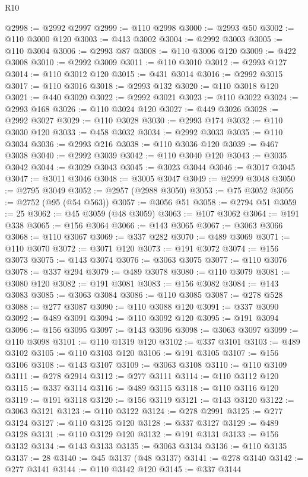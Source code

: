 \begin{lexlean}{R10}
\begin{coremodule}
@2998 := @2992 @2997
@2999 := @110 @2998
@3000 := @2993 @50
@3002 := @110 @3000 @120
@3003 := @413 @3002
@3004 := @2992 @3003
@3005 := @110 @3004
@3006 := @2993 @87
@3008 := @110 @3006 @120
@3009 := @422 @3008
@3010 := @2992 @3009
@3011 := @110 @3010
@3012 := @2993 @127
@3014 := @110 @3012 @120
@3015 := @431 @3014
@3016 := @2992 @3015
@3017 := @110 @3016
@3018 := @2993 @132
@3020 := @110 @3018 @120
@3021 := @440 @3020
@3022 := @2992 @3021
@3023 := @110 @3022
@3024 := @2993 @168
@3026 := @110 @3024 @120
@3027 := @449 @3026
@3028 := @2992 @3027
@3029 := @110 @3028
@3030 := @2993 @174
@3032 := @110 @3030 @120
@3033 := @458 @3032
@3034 := @2992 @3033
@3035 := @110 @3034
@3036 := @2993 @216
@3038 := @110 @3036 @120
@3039 := @467 @3038
@3040 := @2992 @3039
@3042 := @110 @3040 @120
@3043 := @3035 @3042
@3044 := @3029 @3043
@3045 := @3023 @3044
@3046 := @3017 @3045
@3047 := @3011 @3046
@3048 := @3005 @3047
@3049 := @2999 @3048
@3050 := @2795 @3049
@3052 := @2957 (@2988 @3050)
@3053 := @75 @3052
@3056 := @2752 (@95 (@54 @563))
@3057 := @3056 @51
@3058 := @2794 @51
@3059 := 25
@3062 := @45 @3059 (@48 @3059)
@3063 := @107 @3062
@3064 := @191 @338
@3065 := @156 @3064
@3066 := @143 @3065
@3067 := @3063 @3066
@3068 := @110 @3067
@3069 := @337 @282
@3070 := @489 @3069
@3071 := @110 @3070
@3072 := @3071 @120
@3073 := @191 @3072
@3074 := @156 @3073
@3075 := @143 @3074
@3076 := @3063 @3075
@3077 := @110 @3076
@3078 := @337 @294
@3079 := @489 @3078
@3080 := @110 @3079
@3081 := @3080 @120
@3082 := @191 @3081
@3083 := @156 @3082
@3084 := @143 @3083
@3085 := @3063 @3084
@3086 := @110 @3085
@3087 := @278 @528
@3088 := @277 @3087
@3090 := @110 @3088 @120
@3091 := @337 @3090
@3092 := @489 @3091
@3094 := @110 @3092 @120
@3095 := @191 @3094
@3096 := @156 @3095
@3097 := @143 @3096
@3098 := @3063 @3097
@3099 := @110 @3098
@3101 := @110 @1319 @120
@3102 := @337 @3101
@3103 := @489 @3102
@3105 := @110 @3103 @120
@3106 := @191 @3105
@3107 := @156 @3106
@3108 := @143 @3107
@3109 := @3063 @3108
@3110 := @110 @3109
@3111 := @278 @2914
@3112 := @277 @3111
@3114 := @110 @3112 @120
@3115 := @337 @3114
@3116 := @489 @3115
@3118 := @110 @3116 @120
@3119 := @191 @3118
@3120 := @156 @3119
@3121 := @143 @3120
@3122 := @3063 @3121
@3123 := @110 @3122
@3124 := @278 @2991
@3125 := @277 @3124
@3127 := @110 @3125 @120
@3128 := @337 @3127
@3129 := @489 @3128
@3131 := @110 @3129 @120
@3132 := @191 @3131
@3133 := @156 @3132
@3134 := @143 @3133
@3135 := @3063 @3134
@3136 := @110 @3135
@3137 := 28
@3140 := @45 @3137 (@48 @3137)
@3141 := @278 @3140
@3142 := @277 @3141
@3144 := @110 @3142 @120
@3145 := @337 @3144

\end{coremodule}
\end{lexlean}
